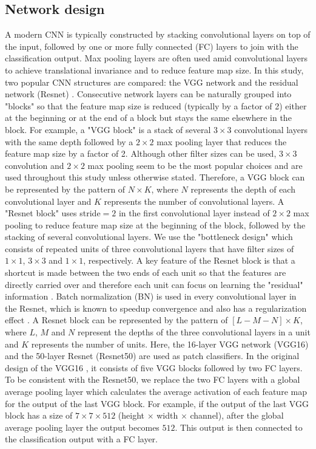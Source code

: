 \documentclass[12pt,letterpaper]{article}
\begin{document}
\subsection{Network design}
A modern CNN is typically constructed by stacking convolutional layers on top of the input, followed by one or more fully connected (FC) layers to join with the classification output. Max pooling layers are often used amid convolutional layers to achieve translational invariance and to reduce feature map size. In this study, two popular CNN structures are compared: the VGG network \cite{simonyan_very_2014} and the residual network (Resnet) \cite{he_deep_2015}. Consecutive network layers can be naturally grouped into "blocks" so that the feature map size is reduced (typically by a factor of 2) either at the beginning or at the end of a block but stays the same elsewhere in the block. For example, a "VGG block" is a stack of several $3 \times 3$ convolutional layers with the same depth followed by a $2 \times 2$ max pooling layer that reduces the feature map size by a factor of 2. Although other filter sizes can be used, $3 \times 3$ convolution and $2 \times 2$ max pooling seem to be the most popular choices and are used throughout this study unless otherwise stated. Therefore, a VGG block can be represented by the pattern of $N \times K$, where $N$ represents the depth of each convolutional layer and $K$ represents the number of convolutional layers. A "Resnet block" uses stride$=2$ in the first convolutional layer instead of $2 \times 2$ max pooling to reduce feature map size at the beginning of the block, followed by the stacking of several convolutional layers. We use the "bottleneck design" \cite{he_deep_2015} which consists of repeated units of three convolutional layers that have filter sizes of $1 \times 1$, $3 \times 3$ and $1 \times 1$, respectively. A key feature of the Resnet block is that a shortcut is made between the two ends of each unit so that the features are directly carried over and therefore each unit can focus on learning the "residual" information \cite{he_deep_2015}. Batch normalization (BN) is used in every convolutional layer in the Resnet, which is known to speedup convergence and also has a regularization effect \cite{ioffe_batch_2015}. A Resnet block can be represented by the pattern of $[L-M-N] \times K$, where $L$, $M$ and $N$ represent the depths of the three convolutional layers in a unit and $K$ represents the number of units. Here, the 16-layer VGG network (VGG16) and the 50-layer Resnet (Resnet50) are used as patch classifiers. In the original design of the VGG16 \cite{simonyan_very_2014}, it consists of five VGG blocks followed by two FC layers. To be consistent with the Resnet50, we replace the two FC layers with a global average pooling layer which calculates the average activation of each feature map for the output of the last VGG block. For example, if the output of the last VGG block has a size of $7 \times 7 \times 512$ (height $\times$ width $\times$ channel), after the global average pooling layer the output becomes $512$. This output is then connected to the classification output with a FC layer.
\end{document}
